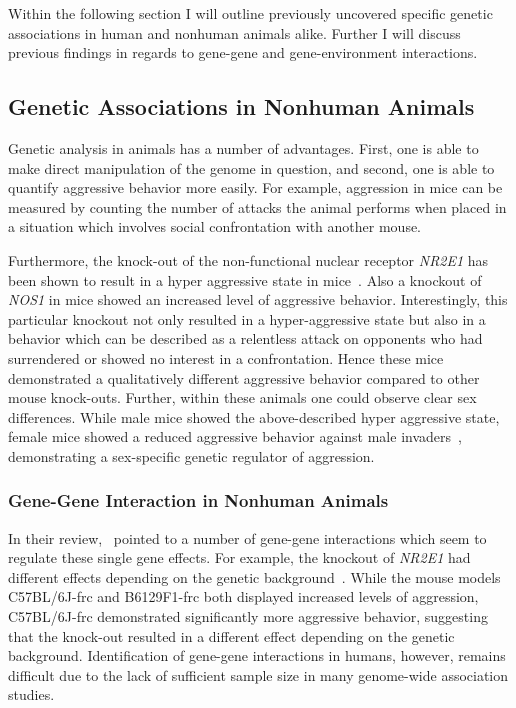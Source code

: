 Within the following section I will outline previously uncovered specific genetic associations in human and nonhuman animals alike.
Further I will discuss previous findings in regards to gene-gene and gene-environment interactions.


\subsection{Genetic Associations in Nonhuman Animals}
\label{sub:genetic_associations_in_animals}

Genetic analysis in animals has a number of advantages.
First, one is able to make direct manipulation of the genome in question, and second, one is able to quantify aggressive behavior more easily.
For example, aggression in mice can be measured by counting the number of attacks the animal performs when placed in a situation which involves social confrontation with another mouse.

Furthermore, the knock-out of the non-functional nuclear receptor \textit{NR2E1} has been shown to result in a hyper aggressive state in mice~\cite{Young2002}.
Also a knockout of \textit{NOS1} in mice showed an increased level of aggressive behavior.
Interestingly, this particular knockout not only resulted in a hyper-aggressive state but also in a behavior which can be described as a relentless attack on opponents who had surrendered or showed no interest in a confrontation.
Hence these mice demonstrated a qualitatively different aggressive behavior compared to other mouse knock-outs.
Further, within these animals one could observe clear sex differences.
While male mice showed the above-described hyper aggressive state, female mice showed a reduced aggressive behavior against male invaders~\cite{Gammie1999,Nelson1995}, demonstrating a sex-specific genetic regulator of aggression.

\subsubsection{Gene-Gene Interaction in Nonhuman Animals}
\label{ssub:Gene-Gene_Interaction_in_nonhuman_animals}

In their review,~\citet{Anholt2012} pointed to a number of gene-gene interactions which seem to regulate these single gene effects.
For example, the knockout of \textit{NR2E1} had different effects depending on the genetic background~\cite{Young2002}.
While the mouse models C57BL/6J-frc and B6129F1-frc both displayed increased levels of aggression, C57BL/6J-frc demonstrated significantly more aggressive behavior,
 suggesting that the knock-out resulted in a different effect depending on the genetic background.
Identification of gene-gene interactions in humans, however, remains difficult due to the lack of sufficient sample size in many genome-wide association studies.

